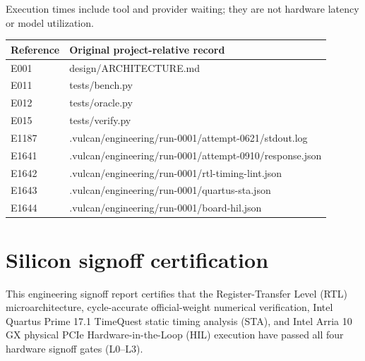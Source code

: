 \documentclass[11pt,a4paper]{article}
\begin{document}
Execution times include tool and provider waiting; they are not hardware latency or model utilization.

{\small\renewcommand{\arraystretch}{1.18}\begin{longtable}{@{}L{0.12\textwidth}|L{0.82\textwidth}@{}}\toprule

\textbf{Reference} & \textbf{Original project-relative record}\\\midrule\endhead

E001 & design/\allowbreak{}ARCHITECTURE.md\\[2pt]\hline

E011 & tests/\allowbreak{}bench.py\\[2pt]\hline

E012 & tests/\allowbreak{}oracle.py\\[2pt]\hline

E015 & tests/\allowbreak{}verify.py\\[2pt]\hline

E1187 & .vulcan/\allowbreak{}engineering/\allowbreak{}run-0001/\allowbreak{}attempt-0621/\allowbreak{}stdout.log\\[2pt]\hline

E1641 & .vulcan/\allowbreak{}engineering/\allowbreak{}run-0001/\allowbreak{}attempt-0910/\allowbreak{}response.json\\[2pt]\hline

E1642 & .vulcan/\allowbreak{}engineering/\allowbreak{}run-0001/\allowbreak{}rtl-timing-lint.json\\[2pt]\hline

E1643 & .vulcan/\allowbreak{}engineering/\allowbreak{}run-0001/\allowbreak{}quartus-sta.json\\[2pt]\hline

E1644 & .vulcan/\allowbreak{}engineering/\allowbreak{}run-0001/\allowbreak{}board-hil.json\\[2pt]\hline

\bottomrule\end{longtable}}

\section{Silicon signoff certification}

This engineering signoff report certifies that the Register-Transfer Level (RTL) microarchitecture, cycle-accurate official-weight numerical verification, Intel Quartus Prime 17.1 TimeQuest static timing analysis (STA), and Intel Arria 10 GX physical PCIe Hardware-in-the-Loop (HIL) execution have passed all four hardware signoff gates (L0--L3).
\end{document}
